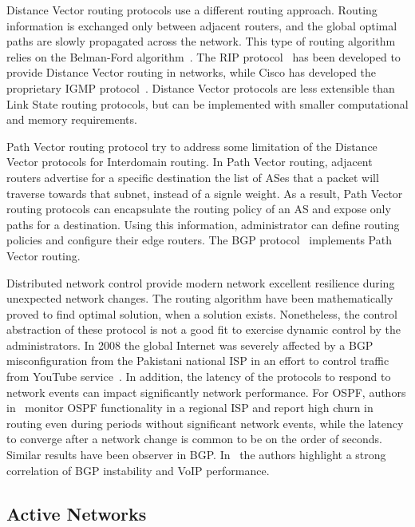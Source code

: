 Distance Vector routing protocols use a different routing approach. Routing
information is exchanged only between adjacent routers, and the global optimal
paths are slowly propagated across the network. This type of routing algorithm
relies on the Belman-Ford algorithm~\cite{bellman1956}. The RIP
protocol~\cite{RFC2453} has been developed to provide Distance Vector routing in
networks, while Cisco has developed the proprietary IGMP
protocol~\cite{Rutgers1991}. Distance Vector protocols are less extensible than
Link State routing protocols, but can be implemented with smaller computational and
memory requirements.

Path Vector routing protocol try to address some limitation of the Distance
Vector protocols for Interdomain routing. In Path Vector routing, adjacent
routers advertise for a specific destination the list of ASes that a packet will
traverse towards that subnet, instead of a signle weight. As a result, Path
Vector routing protocols can encapsulate the routing policy of an AS and expose
only paths for a destination. Using this information, administrator can define
routing policies and configure their edge routers. The BGP
protocol~\cite{RFC1265} implements Path Vector routing.

Distributed network control provide modern network excellent resilience during
unexpected network changes. The routing algorithm have been mathematically
proved to find optimal solution, when a solution exists. Nonetheless, the
control abstraction of these protocol is not a good fit to exercise
dynamic control by the administrators. In 2008 the global Internet was severely
affected by a BGP misconfiguration from the Pakistani national
ISP in an effort to control traffic from YouTube service~\cite{bgp_config_error}. 
In addition, the latency of the protocols
to respond to network events can impact significantly network performance.
For OSPF, authors in~\cite{Watson2003} monitor OSPF
functionality in a regional ISP and report high churn in routing even during
periods without significant network events, while the latency to converge after
a network change is common to be on the order of seconds. Similar results have
been observer in BGP. In~\cite{Kushman2007} the authors highlight a strong 
correlation of BGP instability and VoIP performance. 

\subsection{Active Networks}

